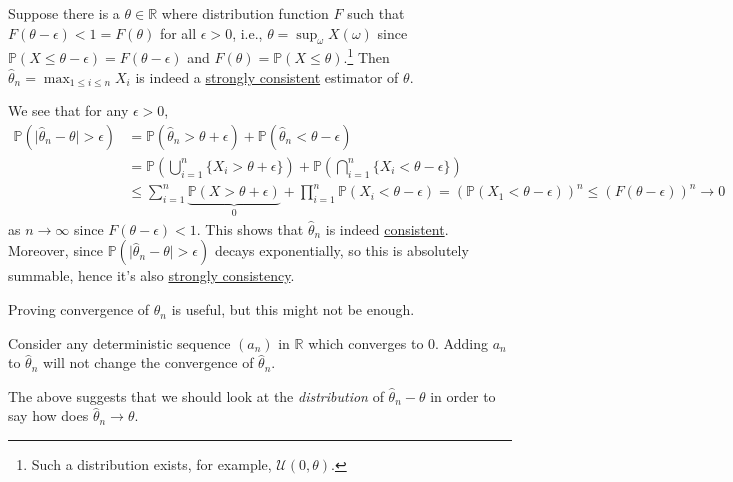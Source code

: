 \begin{eg}
	Suppose there is a \(\theta \in \mathbb{R} \) where distribution function \(F\) such that \(F(\theta - \epsilon ) < 1 = F(\theta )\) for all \(\epsilon > 0\), i.e., \(\theta = \sup_{\omega } X(\omega )\) since \(\mathbb{P} (X \leq \theta - \epsilon ) = F(\theta - \epsilon )\) and \(F(\theta ) = \mathbb{P} (X \leq \theta )\).\footnote{Such a distribution exists, for example, \(\mathcal{U} (0, \theta )\).} Then \(\hat{\theta} _n = \max _{1 \leq i \leq n} X_i \) is indeed a \hyperref[def:strongly-consistent]{strongly consistent} estimator of \(\theta \).
\end{eg}
\begin{explanation}
	We see that for any \(\epsilon > 0\),
	\[
		\begin{split}
			\mathbb{P} (\vert \hat{\theta} _n - \theta \vert > \epsilon )
			 & = \mathbb{P} (\hat{\theta} _n > \theta + \epsilon ) + \mathbb{P} (\hat{\theta} _n < \theta - \epsilon )                                                  \\
			 & = \mathbb{P} \left( \bigcup_{i=1}^{n} \{ X_i > \theta + \epsilon \}  \right) + \mathbb{P} \left( \bigcap_{i=1}^{n} \{ X_i < \theta - \epsilon \} \right) \\
			 & \leq \sum_{i=1}^{n} \underbrace{\mathbb{P} (X > \theta + \epsilon )}_{0} + \prod_{i=1}^{n} \mathbb{P} (X_i < \theta -\epsilon )
			= \left( \mathbb{P} (X_1 < \theta - \epsilon ) \right) ^n
			\leq \left( F(\theta - \epsilon ) \right) ^n \to 0
		\end{split}
	\]
	as \(n \to \infty \) since \(F(\theta - \epsilon ) < 1\). This shows that \(\hat{\theta} _n\) is indeed \hyperref[def:consistent]{consistent}. Moreover, since \(\mathbb{P} (\vert \hat{\theta} _n - \theta \vert > \epsilon )\) decays exponentially, so this is absolutely summable, hence it's also \hyperref[def:strongly-consistent]{strongly consistency}.
\end{explanation}

Proving convergence of \(\hat{\theta} _n\) is useful, but this might not be enough.

\begin{eg}
	Consider any deterministic sequence \((a_n)\) in \(\mathbb{R} \) which converges to \(0\). Adding \(a_n\) to \(\hat{\theta} _n\) will not change the convergence of \(\hat{\theta} _n\).
\end{eg}

The above suggests that we should look at the \emph{distribution} of \(\hat{\theta} _n - \theta \) in order to say how does \(\hat{\theta} _n \to \theta \).

